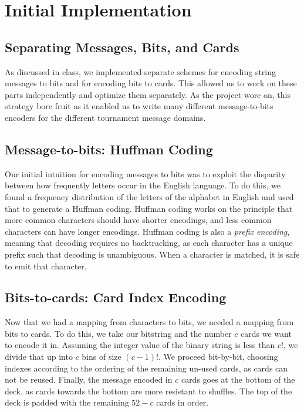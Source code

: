\documentclass[titlepage]{article}
\begin{document}
\section{Initial Implementation}

\subsection{Separating Messages, Bits, and Cards}
As discussed in class, we implemented separate schemes for encoding string messages to bits and for encoding bits to cards. This allowed us to work on these parts independently and optimize them separately. As the project wore on, this strategy bore fruit as it enabled us to write many different message-to-bits encoders for the different tournament message domains.

\subsection{Message-to-bits: Huffman Coding}
Our initial intuition for encoding messages to bits was to exploit the disparity between how frequently letters occur in the English language. To do this, we found a frequency distribution of the letters of the alphabet in English and used that to generate a Huffman coding. Huffman coding works on the principle that more common characters should have shorter encodings, and less common characters can have longer encodings. Huffman coding is also a \textit{prefix encoding}, meaning that decoding requires no backtracking, as each character has a unique prefix such that decoding is unambiguous. When a character is matched, it is safe to emit that character.

\subsection{Bits-to-cards: Card Index Encoding}
Now that we had a mapping from characters to bits, we needed a mapping from bits to cards. To do this, we take our bitstring and the number $c$ cards we want to encode it in. Assuming the integer value of the binary string is less than $c!$, we divide that up into $c$ bins of size $(c-1)!$. We proceed bit-by-bit, choosing indexes according to the ordering of the remaining un-used cards, as cards can not be reused. Finally, the message encoded in $c$ cards goes at the bottom of the deck, as cards towards the bottom are more resistant to shuffles. The top of the deck is padded with the remaining $52-c$ cards in order.
\end{document}
